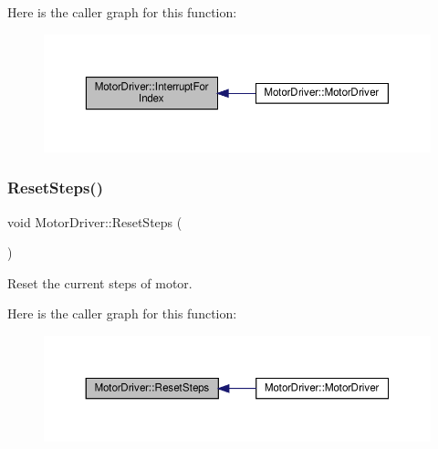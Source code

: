 Here is the caller graph for this function\+:
\nopagebreak
\begin{figure}[H]
\begin{center}
\leavevmode
\includegraphics[width=350pt]{classMotorDriver_a74f208c889afd6ed5cf5008fbb0fdb63_icgraph}
\end{center}
\end{figure}
\mbox{\label{classMotorDriver_a19833e114feff56c3a7d1d032a455e0a}} 
\subsubsection{\texorpdfstring{Reset\+Steps()}{ResetSteps()}}
{\footnotesize\ttfamily void Motor\+Driver\+::\+Reset\+Steps (\begin{DoxyParamCaption}{ }\end{DoxyParamCaption})\hspace{0.3cm}{\ttfamily [private]}}



Reset the current steps of motor. 

Here is the caller graph for this function\+:
\nopagebreak
\begin{figure}[H]
\begin{center}
\leavevmode
\includegraphics[width=350pt]{classMotorDriver_a19833e114feff56c3a7d1d032a455e0a_icgraph}
\end{center}
\end{figure}
\mbox{\label{classMotorDriver_a64827491330490668bb8f8e57d0f3942}} 
